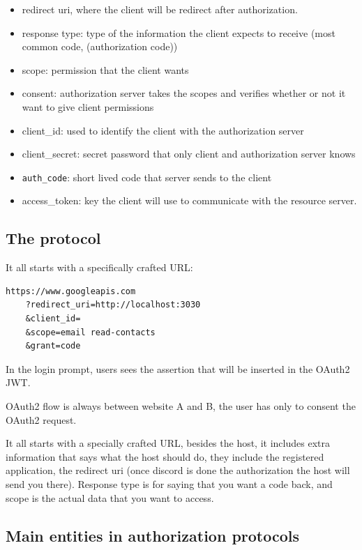 \documentclass[11pt]{style}
\begin{document}
\begin{itemize}
    \item  redirect uri, where the client will be redirect after authorization.
    \item  response type: type of the information the client expects to receive
        (most common code, (authorization code))
    \item  scope: permission that the client wants
    \item  consent: authorization server takes the scopes and verifies whether or not
        it want to give client permissions
    \item  client\_id: used to identify the client with the authorization server
    \item  client\_secret: secret password that only client and authorization server knows
    \item  \texttt{auth\_code}: short lived code that server sends to the client
    \item access\_token: key the client will use to communicate with the resource server.
\end{itemize}

\subsection{The protocol}
It all starts with a specifically crafted URL:
\begin{lstlisting}
https://www.googleapis.com
    ?redirect_uri=http://localhost:3030
    &client_id=
    &scope=email read-contacts
    &grant=code
\end{lstlisting}

In the login prompt, users sees the assertion that will be inserted in the
OAuth2 JWT.

OAuth2 flow is always between website A and B, the user has only to consent the
OAuth2 request.

It all starts with a specially crafted URL, besides the host, it includes extra
information that says what the host should do, they include the registered
application, the redirect uri (once discord is done the authorization the host
will send you there). Response type is for saying that you want a code back, and
scope is the actual data that you want to access.


\subsection{Main entities in authorization protocols}
\end{document}
